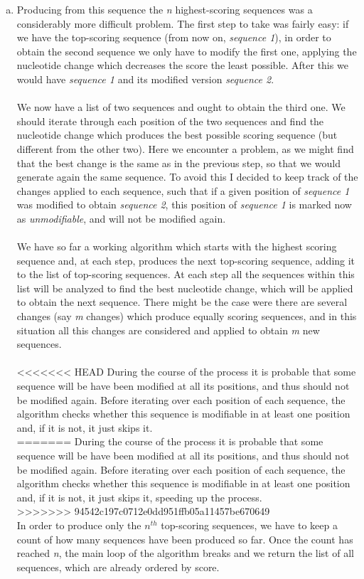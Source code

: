 \documentclass{article}
\begin{document}
\begin{enumerate}[a)]
\item Producing from this sequence the \emph{n} highest-scoring sequences was a considerably more difficult problem. The first step to take was fairly easy: if we have the top-scoring sequence (from now on, \emph{sequence 1}), in order to obtain the second sequence we only have to modify the first one, applying the nucleotide change which decreases the score the least possible. After this we would have \emph{sequence 1} and its modified version \emph{sequence 2}.\\
\\
We now have a list of two sequences and ought to obtain the third one. We should iterate through each position of the two sequences and find the nucleotide change which produces the best possible scoring sequence (but different from the other two). Here we encounter a problem, as we might find that the best change is the same as in the previous step, so that we would generate again the same sequence. To avoid this I decided to keep track of the changes applied to each sequence, such that if a given position of \emph{sequence 1} was modified to obtain \emph{sequence 2}, this position of \emph{sequence 1} is marked now as \emph{unmodifiable}, and will not be modified again.\\
\\
We have so far a working algorithm which starts with the highest scoring sequence and, at each step, produces the next top-scoring sequence, adding it to the list of top-scoring sequences. At each step all the sequences within this list will be analyzed to find the best nucleotide change, which will be applied to obtain the next sequence. There might be the case were there are several changes (say \emph{m} changes) which produce equally scoring sequences, and in this situation all this changes are considered and applied to obtain \emph{m} new sequences.\\
\\
<<<<<<< HEAD
During the course of the process it is probable that some sequence will be have been modified at all its positions, and thus should not be modified again. Before iterating over each position of each sequence, the algorithm checks whether this sequence is modifiable in at least one position and, if it is not, it just skips it.\\
=======
During the course of the process it is probable that some sequence will be have been modified at all its positions, and thus should not be modified again. Before iterating over each position of each sequence, the algorithm checks whether this sequence is modifiable in at least one position and, if it is not, it just skips it, speeding up the process.\\
>>>>>>> 94542c197c0712e0dd951ffb05a11457be670649
\\
In order to produce only the \(n^{th}\) top-scoring sequences, we have to keep a count of how many sequences have been produced so far. Once the count has reached \emph{n}, the main loop of the algorithm breaks and we return the list of all sequences, which are already ordered by score.
\end{enumerate}
\end{document}
